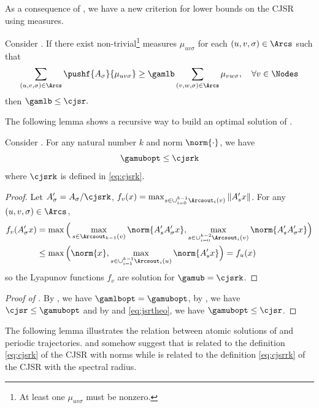 As a consequence of , we have a new criterion for lower bounds on the CJSR using measures.
\begin{corollary}
  \label{coro:instabcert}
  Consider .
  If there exist non-trivial\footnote{At least one $\mu_{uv\sigma}$ must be nonzero.} measures $\mu_{uv\sigma}$ for each $(u,v,\sigma) \in \Arcs$ such that
  \[ \sum_{(u,v,\sigma) \in \Arcs} \pushf{A_{\sigma}}{\mu_{uv\sigma}} \geq \gamlb \sum_{(v,w,\sigma) \in \Arcs} \mu_{vw\sigma}, \quad \forall v \in \Nodes \]
  then
  \( \gamlb \leq \cjsr. \)
\end{corollary}


The following lemma shows a recursive way to build an optimal solution of .

\begin{lemma}
    \label{lem:primalbuild}
    Consider .
    For any natural number $k$ and norm $\norm{\cdot}$, we have
    \[ \gamubopt \leq \cjsrk \]
    where $\cjsrk$ is defined in \eqref{eq:cjsrk}.
    \begin{proof}
        Let $A'_\sigma = A_\sigma/\cjsrk$, $f_v(x) = \max_{s \in \cup_{i=0}^{k-1}\Arcsout_i(v)} \|A'_s x\|$.
        For any \arc{} $(u,v,\sigma) \in \Arcs$,
        \begin{align*}
          f_v(A'_\sigma x)
          & =
          \max\Big(\max_{s \in \Arcsout_{k-1}(v)} \norm{A'_sA'_\sigma x}, \max_{s \in \cup_{i=0}^{k-2} \Arcsout_i(v)} \norm{A'_sA'_\sigma x} \Big)\\
          & \leq
          \max\Big(\norm{x}, \max_{s \in \cup_{i=1}^{k-1} \Arcsout_i(u)} \norm{A'_s x} \Big)
          = f_u(x)
        \end{align*}
        so the Lyapunov functions $f_v$ are solution for $\gamub = \cjsrk$.
    \end{proof}
\end{lemma}

\begin{proof}[Proof of ]
    By , we have $\gamlbopt = \gamubopt$, by , we have $\cjsr \leq \gamubopt$ and by  and \eqref{eq:jsrtheo}, we have $\gamubopt \leq \cjsr$.
\end{proof}


The following lemma illustrates the relation between atomic solutions of  and periodic trajectories.
 and  somehow suggest that  is related to the definition \eqref{eq:cjsrk} of the CJSR with norms while  is related to the definition \eqref{eq:cjsrrk} of the CJSR with the spectral radius.


